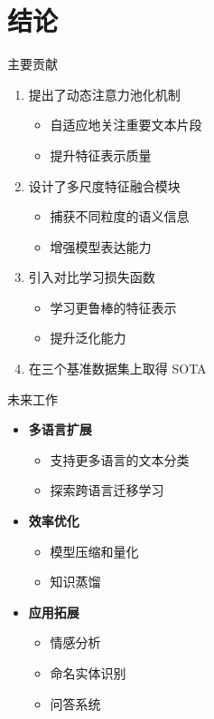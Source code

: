\documentclass[aspectratio=169]{beamer}
\begin{document}
\section{结论}

\begin{frame}{主要贡献}
  \begin{enumerate}
    \item 提出了动态注意力池化机制
    \begin{itemize}
      \item 自适应地关注重要文本片段
      \item 提升特征表示质量
    \end{itemize}

    \item 设计了多尺度特征融合模块
    \begin{itemize}
      \item 捕获不同粒度的语义信息
      \item 增强模型表达能力
    \end{itemize}

    \item 引入对比学习损失函数
    \begin{itemize}
      \item 学习更鲁棒的特征表示
      \item 提升泛化能力
    \end{itemize}

    \item 在三个基准数据集上取得 SOTA
  \end{enumerate}
\end{frame}

\begin{frame}{未来工作}
  \begin{itemize}
    \item \textbf{多语言扩展}
    \begin{itemize}
      \item 支持更多语言的文本分类
      \item 探索跨语言迁移学习
    \end{itemize}

    \item \textbf{效率优化}
    \begin{itemize}
      \item 模型压缩和量化
      \item 知识蒸馏
    \end{itemize}

    \item \textbf{应用拓展}
    \begin{itemize}
      \item 情感分析
      \item 命名实体识别
      \item 问答系统
    \end{itemize}
  \end{itemize}
\end{frame}
\end{document}
